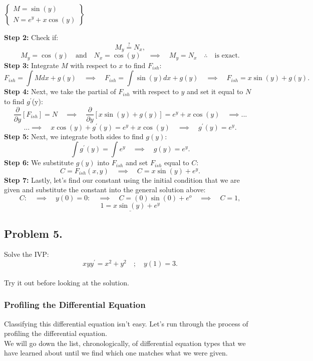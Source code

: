 \documentclass[a4paper,12pt]{article} %
\begin{document}
 \begin{center}
$\left\{
\begin{array}{l}
 	 M = \sin(y)\\
 N = e^y + x\cos(y)
\end{array}
\right\}$
\end{center}
\textbf{Step 2:} Check if:
$$M_y \stackrel{?}{=} N_x,$$
$$M_y = \cos(y) \quad\text{and}\quad N_x=\cos(y) \quad\implies \quad M_y =N_x \quad\therefore\quad \text{is exact}. $$
\textbf{Step 3:}
Integrate $M$ with respect to $x$ to find $F_{ish}$:
$$ F_{ish} = \int Mdx + g(y) \quad\implies \quad F_{ish} = \int \sin(y)dx + g(y) \quad\implies \quad F_{ish} = x\sin(y) + g(y). $$
\textbf{Step 4:} Next, we take the partial of $F_{ish}$ with respect to $y$ and set it equal to $N$ to find $g^{\prime}$(y):
$$ \frac{\partial}{\partial y}[F_{ish}] = N \quad\implies \quad \frac{\partial}{\partial y}[x\sin(y) + g(y)] = e^y + x\cos(y) \quad\implies ...$$
$$...\implies \quad x\cos(y) + g^{\prime}(y) = e^y + x\cos(y) \quad\implies \quad g^{\prime}(y) = e^y.$$
\textbf{Step 5:} Next, we integrate both sides to find $g(y)$:
$$ \int g^{\prime}(y) = \int e^y \quad\implies \quad g(y) = e^y.$$
\textbf{Step 6:} We substitute $g(y)$ into $F_{ish}$ and set $F_{ish}$ equal to $C$:
$$ C = F_{ish}(x,y) \quad\implies \quad C = x\sin(y) + e^y. $$
\textbf{Step 7:} Lastly, let's find our constant using the initial condition that we are given and substitute the constant into the general solution above:
$$ C: \quad\implies \quad y(0)=0: \quad\implies \quad C = (0)\sin(0) + e^{o} \quad\implies \quad C = 1, $$
$$ \underline{\boxed{1 = x\sin(y) + e^y}}  $$

\pagebreak

\subsection*{Problem 5.} Solve the IVP:
$$ xyy^\prime = x^2 + y^2 \quad ; \quad y(1) = 3.$$
\\
 
Try it out before looking at the solution.
\pagebreak
 
 \subsubsection*{Profiling the Differential Equation}
 Classifying this differential equation isn't easy. Let's run through the process of profiling the differential equation.\\
 
 We will go down the list, chronologically, of differential equation types that we have learned about until we find which one matches what we were given.\\
\end{document}
